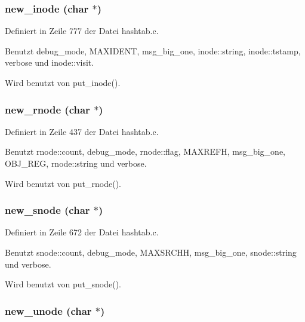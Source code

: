 \subsubsection{ new\_\-inode (char $\ast$)}\label{hashtab_8c_850b758cda6a66b5563aa41454279b76}




Definiert in Zeile 777 der Datei hashtab.c.

Benutzt debug\_\-mode, MAXIDENT, msg\_\-big\_\-one, inode::string, inode::tstamp, verbose und inode::visit.

Wird benutzt von put\_\-inode().
\subsubsection{ new\_\-rnode (char $\ast$)}\label{hashtab_8c_b9cf53c565bbf77a87c29f745ef76a80}




Definiert in Zeile 437 der Datei hashtab.c.

Benutzt rnode::count, debug\_\-mode, rnode::flag, MAXREFH, msg\_\-big\_\-one, OBJ\_\-REG, rnode::string und verbose.

Wird benutzt von put\_\-rnode().
\subsubsection{ new\_\-snode (char $\ast$)}\label{hashtab_8c_40b9a825d5fab2416f5911a3255980f9}




Definiert in Zeile 672 der Datei hashtab.c.

Benutzt snode::count, debug\_\-mode, MAXSRCHH, msg\_\-big\_\-one, snode::string und verbose.

Wird benutzt von put\_\-snode().
\subsubsection{ new\_\-unode (char $\ast$)}\label{hashtab_8c_e97ded5fe5fa045e492128b73ff18c8b}




